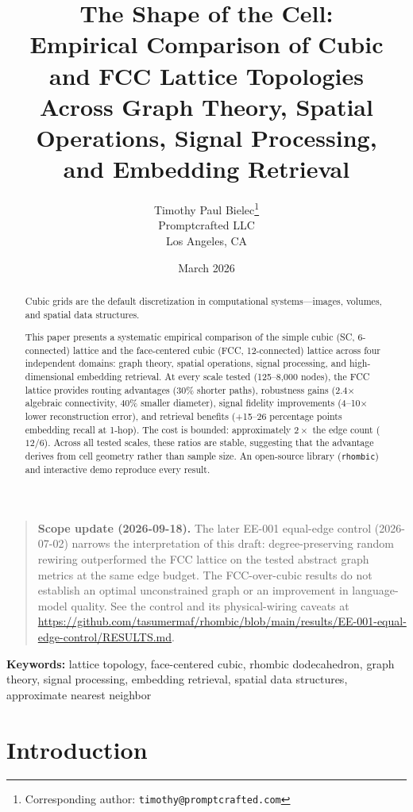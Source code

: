 \documentclass[11pt]{article}
\title{%
  The Shape of the Cell:\\
  Empirical Comparison of Cubic and FCC Lattice Topologies\\
  Across Graph Theory, Spatial Operations, Signal Processing,\\
  and Embedding Retrieval%
}
\author{%
  Timothy Paul Bielec\thanks{Corresponding author: \texttt{timothy@promptcrafted.com}}\\
  Promptcrafted LLC\\
  Los Angeles, CA
}
\date{March 2026}
\begin{document}
\maketitle

\begin{quote}\small
\textbf{Scope update (2026-09-18).}
The later EE-001 equal-edge control (2026-07-02) narrows the interpretation
of this draft: degree-preserving random rewiring outperformed the FCC
lattice on the tested abstract graph metrics at the same edge budget.
The FCC-over-cubic results do not establish an optimal unconstrained
graph or an improvement in language-model quality. See the control and
its physical-wiring caveats at
\url{https://github.com/tasumermaf/rhombic/blob/main/results/EE-001-equal-edge-control/RESULTS.md}.
\end{quote}

\begin{abstract}
Cubic grids are the default discretization in computational
systems---images, volumes, and spatial data structures.

This paper presents a systematic empirical comparison of the simple cubic
(SC, 6-connected) lattice and the face-centered cubic (FCC,
12-connected) lattice across four independent domains: graph theory,
spatial operations, signal processing, and high-dimensional embedding
retrieval. At every scale tested (125--8{,}000 nodes), the FCC lattice
provides routing advantages (30\% shorter paths),
robustness gains (2.4$\times$ algebraic connectivity, 40\% smaller
diameter), signal fidelity improvements (4--10$\times$ lower
reconstruction error), and retrieval benefits (+15--26 percentage
points embedding recall at 1-hop). The cost is bounded: approximately
$2\times$ the edge count ($12/6$). Across all tested scales, these ratios are stable,
suggesting that the advantage derives from cell geometry rather
than sample size. An open-source library (\texttt{rhombic}) and interactive demo
reproduce every result.
\end{abstract}

\noindent\textbf{Keywords:} lattice topology, face-centered cubic,
rhombic dodecahedron, graph theory, signal processing, embedding
retrieval, spatial data structures, approximate nearest neighbor

\section{Introduction}
\label{sec:intro}
\end{document}
